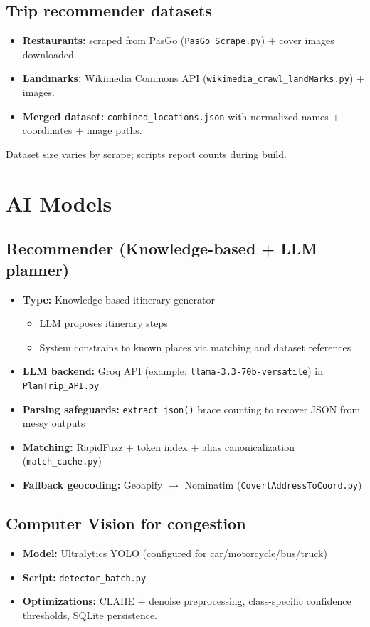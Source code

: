 \subsection{Trip recommender datasets}
\begin{itemize}
  \item \textbf{Restaurants:} scraped from PasGo (\texttt{PasGo\_Scrape.py}) + cover images downloaded.
  \item \textbf{Landmarks:} Wikimedia Commons API (\texttt{wikimedia\_crawl\_landMarks.py}) + images.
  \item \textbf{Merged dataset:} \texttt{combined\_locations.json} with normalized names + coordinates + image paths.
\end{itemize}

Dataset size varies by scrape; scripts report counts during build.

\section{AI Models}

\subsection{Recommender (Knowledge-based + LLM planner)}
\begin{itemize}
  \item \textbf{Type:} Knowledge-based itinerary generator
  \begin{itemize}
    \item LLM proposes itinerary steps
    \item System constrains to known places via matching and dataset references
  \end{itemize}
  \item \textbf{LLM backend:} Groq API (example: \texttt{llama-3.3-70b-versatile}) in \texttt{PlanTrip\_API.py}
  \item \textbf{Parsing safeguards:} \texttt{extract\_json()} brace counting to recover JSON from messy outputs
  \item \textbf{Matching:} RapidFuzz + token index + alias canonicalization (\texttt{match\_cache.py})
  \item \textbf{Fallback geocoding:} Geoapify $\rightarrow$ Nominatim (\texttt{CovertAddressToCoord.py})
\end{itemize}

\subsection{Computer Vision for congestion}
\begin{itemize}
  \item \textbf{Model:} Ultralytics YOLO (configured for car/motorcycle/bus/truck)
  \item \textbf{Script:} \texttt{detector\_batch.py}
  \item \textbf{Optimizations:} CLAHE + denoise preprocessing, class-specific confidence thresholds, SQLite persistence.
\end{itemize}

